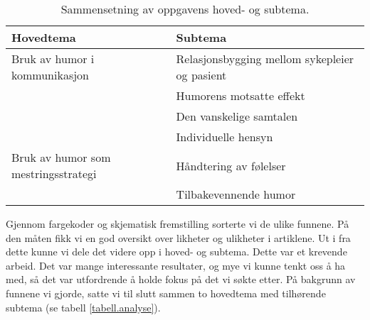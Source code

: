 \begin{table}
  \centering
  \small
  \begin{tabular}{@{}ll@{}}
    \toprule
    \textbf{Hovedtema} & \textbf{Subtema} \\
    \midrule
    Bruk av humor i kommunikasjon
      & Relasjonsbygging mellom sykepleier og pasient \\
      & Humorens motsatte effekt \\
      & Den vanskelige samtalen \\
      & Individuelle hensyn \\
    \midrule
    Bruk av humor som mestringsstrategi
      & Håndtering av følelser \\
      & Tilbakevennende humor \\
    \bottomrule
  \end{tabular}
  \caption{Sammensetning av oppgavens hoved- og subtema.}
  \label{tabell.analyse}
\end{table}

Gjennom fargekoder og skjematisk fremstilling sorterte vi de ulike funnene. På
den måten fikk vi en god oversikt over likheter og ulikheter i artiklene. Ut i
fra dette kunne vi dele det videre opp i hoved- og subtema. Dette var et
krevende arbeid. Det var mange interessante resultater, og mye vi kunne tenkt
oss å ha med, så det var utfordrende å holde fokus på det vi søkte etter. På
bakgrunn av funnene vi gjorde, satte vi til slutt sammen to hovedtema med
tilhørende subtema (se tabell \vref{tabell.analyse}).
